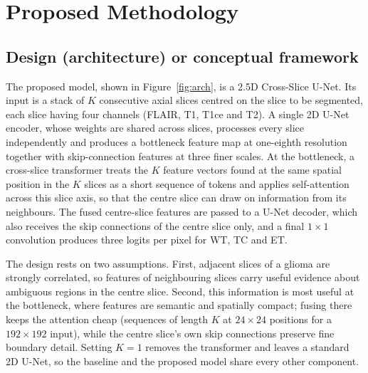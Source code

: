 \clearpage
\chapter{Proposed Methodology}
\section{Design (architecture) or conceptual framework}
The proposed model, shown in Figure~\ref{fig:arch}, is a 2.5D Cross-Slice U-Net. Its input is a stack of $K$ consecutive axial slices centred on the slice to be segmented, each slice having four channels (FLAIR, T1, T1ce and T2). A single 2D U-Net encoder, whose weights are shared across slices, processes every slice independently and produces a bottleneck feature map at one-eighth resolution together with skip-connection features at three finer scales. At the bottleneck, a cross-slice transformer treats the $K$ feature vectors found at the same spatial position in the $K$ slices as a short sequence of tokens and applies self-attention across this slice axis, so that the centre slice can draw on information from its neighbours. The fused centre-slice features are passed to a U-Net decoder, which also receives the skip connections of the centre slice only, and a final $1 \times 1$ convolution produces three logits per pixel for WT, TC and ET.

The design rests on two assumptions. First, adjacent slices of a glioma are strongly correlated, so features of neighbouring slices carry useful evidence about ambiguous regions in the centre slice. Second, this information is most useful at the bottleneck, where features are semantic and spatially compact; fusing there keeps the attention cheap (sequences of length $K$ at $24 \times 24$ positions for a $192 \times 192$ input), while the centre slice's own skip connections preserve fine boundary detail. Setting $K=1$ removes the transformer and leaves a standard 2D U-Net, so the baseline and the proposed model share every other component.

